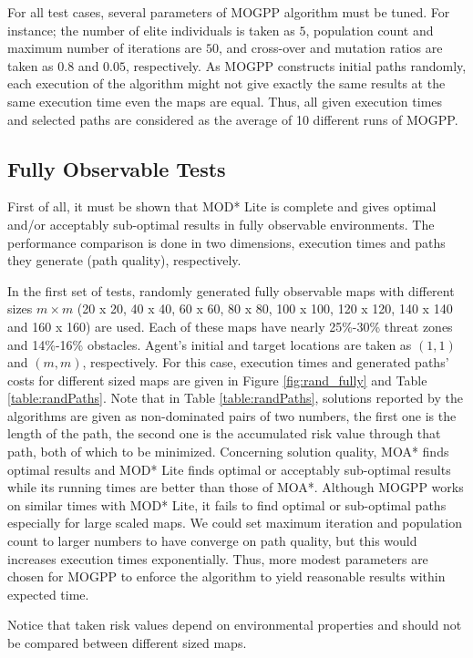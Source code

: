 \documentclass[10pt,journal]{IEEEtran}
\begin{document}
For all test cases, several parameters of MOGPP algorithm must be tuned. For instance; the number of elite individuals is taken as $5$, population count and maximum number of iterations are $50$, and cross-over and mutation ratios are taken as $0.8$ and $0.05$, respectively. As MOGPP constructs initial paths randomly, each execution of the algorithm might not give exactly the same results at the same execution time even the maps are equal. Thus, all given execution times and selected paths are considered as the average of 10 different runs of MOGPP.

\subsection{Fully Observable Tests}

First of all, it must be shown that MOD* Lite is complete and gives optimal and/or acceptably sub-optimal results in fully observable environments. The performance comparison is done in two dimensions, execution times and paths they generate (path quality), respectively.

In the first set of tests, randomly generated fully observable maps with different sizes $m \times m$ (20 x 20, 40 x 40, 60 x 60, 80 x 80, 100 x 100, 120 x 120, 140 x 140 and 160 x 160) are used. Each of these maps have nearly 25\%-30\%  threat zones and 14\%-16\%  obstacles. Agent's initial and target locations are taken as $(1, 1)$ and $(m, m)$, respectively. For this case, execution times and generated paths' costs for different sized maps are given in Figure \ref{fig:rand_fully} and Table \ref{table:randPaths}. Note that in Table \ref{table:randPaths}, solutions reported by the algorithms are given as non-dominated pairs of two numbers, the first one is the length of the path, the second one is the accumulated risk value through that path, both of which to be minimized. Concerning solution quality, MOA* finds optimal results and MOD* Lite finds optimal or acceptably sub-optimal results while its running times are better than those of MOA*. Although MOGPP works on similar times with MOD* Lite, it fails to find optimal or sub-optimal paths  especially for large scaled maps. We could set maximum iteration and population count to larger numbers to have converge on path quality, but this would increases execution times exponentially. Thus, more modest parameters are chosen for MOGPP to enforce the algorithm to yield reasonable results within expected time. 
 
Notice that taken risk values depend on environmental properties and should not be compared between different sized maps.
\end{document}
